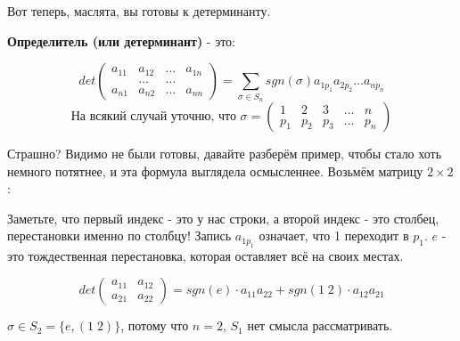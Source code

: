 \documentclass[12pt]{article}
\begin{document}
Вот теперь, маслята, вы готовы к детерминанту.

\begin{definitionbox}
    \textbf{Определитель (или детерминант)} - это:

    \[
        det \begin{pmatrix}
            a_{11} & a_{12} & \dots &a_{1n}\\
            &\dots & \dots \\
            a_{n1} & a_{n2} & \dots & a_{nn}
        \end{pmatrix} = \sum_{\sigma \in S_n} sgn(\sigma) a_{1p_1} a_{2p_2} \dots a_{np_n}
    \]
    \[ \text{На всякий случай уточню, что }
    \sigma = \begin{pmatrix}
        1 & 2 & 3 & \dots & n\\
        p_1 & p_2 & p_3 & \dots & p_n
    \end{pmatrix}
    \]
\end{definitionbox}

Страшно? Видимо не были готовы, давайте разберём пример, чтобы стало хоть немного потятнее, и эта формула выглядела осмысленнее. Возьмём матрицу $2\times 2$:

\begin{examplebox}
    Заметьте, что первый индекс - это у нас строки, а второй индекс - это столбец, перестановки именно по столбцу! Запись $a_{1p_1}$ означает, что 1 переходит в $p_1$. $e$ - это тождественная перестановка, которая оставляет всё на своих местах.

    \[
    det\begin{pmatrix}
        a_{11} & a_{12} \\
        a_{21} & a_{22}
    \end{pmatrix} = sgn(e) \cdot a_{11} a_{22} + sgn(1\;2) \cdot a_{12} a_{21}
    \]

    $\sigma \in S_2 = \{e, (1\;2)\}$, потому что $n = 2$, $S_1$ нет смысла рассматривать.
\end{examplebox}
\end{document}
